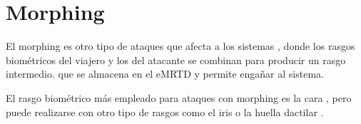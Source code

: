 

\section{Morphing}\label{sec:estadoArteMorphing}

El \gls{morphing} \cite{ferrara2014magic} es otro tipo de ataques que afecta a los sistemas , donde los rasgos biométricos del viajero y los del atacante se combinan para producir un rasgo intermedio. que se almacena en el \Gls{eMRTD} y permite engañar al sistema.

El rasgo biométrico más empleado para ataques con \gls{morphing} es la cara , pero puede realizarse con otro tipo de rasgos como el \gls{iris} \cite{rathgeb2017feasibility} o la huella \gls{dactilar} \cite{ferrara2016feasibility}. 

